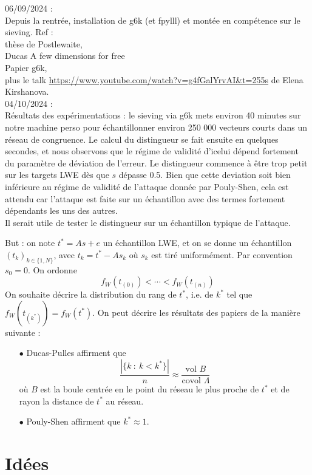 \documentclass{article}
\begin{document}
06/09/2024 : \\
Depuis la rentrée, installation de g6k (et fpylll) et montée en compétence sur le sieving. 
Ref : \\
thèse de Postlewaite, \\
Ducas A few dimensions for free\\
Papier g6k, \\
plus le talk \url{https://www.youtube.com/watch?v=g4fGalYrvAI&t=255s} de Elena Kirshanova.\\

04/10/2024 :\\
Résultats des expérimentations : le sieving via g6k mets environ 40 minutes sur notre machine perso pour échantillonner environ 250 000 vecteurs courts dans un réseau de congruence. Le calcul du distingueur se fait ensuite en quelques secondes, et nous observons que le régime de validité d'icelui dépend fortement du paramètre de déviation de l'erreur. Le distingueur commence à être trop petit sur les targets LWE dès que $s$ dépasse 0.5. Bien que cette deviation soit bien inférieure au régime de validité de l'attaque donnée par Pouly-Shen, cela est attendu car l'attaque est faite sur un échantillon avec des termes fortement dépendants les uns des autres.\\

Il serait utile de tester le distingueur sur un échantillon typique de l'attaque. 

But : on note $t^* = As+e$ un échantillon LWE, et on se donne un échantillon $(t_k)_{k\in\{1,N\}}$, avec $t_k = t^* - A s_k$ où $s_k$ est tiré uniformément. Par convention $s_0=0$. On ordonne 
\[ f_W(t_{(0)})<\cdots < f_W(t_{(n)}) \]
On souhaite décrire la distribution du rang de $t^*$, i.e. de $k^*$ tel que $f_W(t_{(k^*)}) = f_W(t^*)$.
On peut décrire les résultats des papiers de la manière suivante :
\begin{itemize}
\item[$\bullet$] Ducas-Pulles affirment que 
\[\frac{|\{k \ : \ k < k^* \}|}{n} \approx \frac{\text{vol }B}{\text{covol }\Lambda}\]
où $B$ est la boule centrée en le point du réseau le plus proche de $t^*$ et de rayon la distance de $t^*$ au réseau.
\item[$\bullet$] Pouly-Shen affirment que $k^*\approx 1$.
\end{itemize}
\section{Idées}
\end{document}
